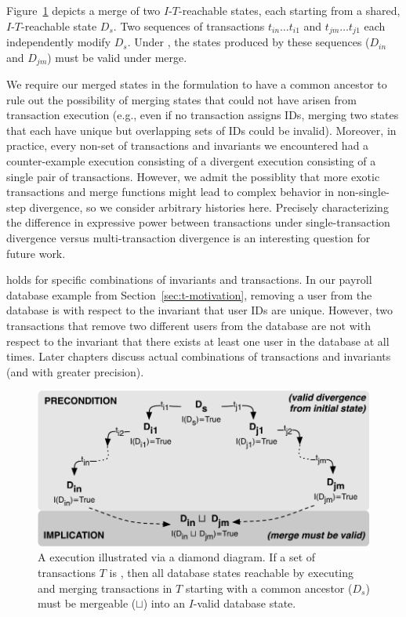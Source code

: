 Figure~\ref{fig:iconfluence} depicts a \iconfluent merge of
two $I$-$T$-reachable states, each starting from a shared,
$I$-$T$-reachable state $D_s$. Two sequences of transactions
$t_{in}\dots t_{i1}$ and $t_{jm}\dots t_{j1}$ each independently
modify $D_s$. Under \iconfluence, the states produced by these
sequences ($D_{in}$ and $D_{jm}$) must be valid under
merge.

We require our merged states in the \iconfluence formulation to have a
common ancestor to rule out the possibility of merging states that
could not have arisen from transaction execution (e.g., even if no
transaction assigns IDs, merging two states that each have unique but
overlapping sets of IDs could be invalid). Moreover, in practice,
every non-\iconfluent set of transactions and invariants we
encountered had a counter-example execution consisting of a divergent
execution consisting of a single pair of transactions. However, we
admit the possiblity that more exotic transactions and merge functions
might lead to complex behavior in non-single-step divergence, so we
consider arbitrary histories here. Precisely characterizing the
difference in expressive power between \iconfluent transactions under
single-transaction divergence versus multi-transaction divergence is
an interesting question for future work.

\Iconfluence holds for specific combinations of invariants and
transactions. In our payroll database example from
Section~\ref{sec:t-motivation}, removing a user from the database is
\iconfluent with respect to the invariant that user IDs are
unique. However, two transactions that remove two different users from
the database are not \iconfluent with respect to the invariant that
there exists at least one user in the database at all times. Later
chapters discuss actual combinations of transactions and invariants
(and with greater precision).

\begin{figure}
\begin{center}
\includegraphics[width=\figscale\columnwidth]{figs/icommute.pdf}\vspace{-1em}
\end{center}\vspace{1em}
\caption{A \iconfluent execution illustrated via a diamond
  diagram. If a set of transactions $T$ is \iconfluent, then all
  database states reachable by executing and merging transactions in
  $T$ starting with a common ancestor ($D_s$) must
  be mergeable ($\sqcup$) into an $I$-valid database state.}
\label{fig:iconfluence}
\end{figure}

